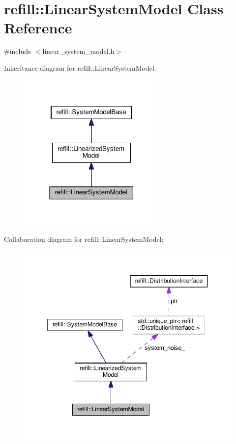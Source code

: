 \hypertarget{classrefill_1_1LinearSystemModel}{}\section{refill\+:\+:Linear\+System\+Model Class Reference}
\label{classrefill_1_1LinearSystemModel}


{\ttfamily \#include $<$linear\+\_\+system\+\_\+model.\+h$>$}



Inheritance diagram for refill\+:\+:Linear\+System\+Model\+:\nopagebreak
\begin{figure}[H]
\begin{center}
\leavevmode
\includegraphics[width=207pt]{classrefill_1_1LinearSystemModel__inherit__graph}
\end{center}
\end{figure}


Collaboration diagram for refill\+:\+:Linear\+System\+Model\+:\nopagebreak
\begin{figure}[H]
\begin{center}
\leavevmode
\includegraphics[width=345pt]{classrefill_1_1LinearSystemModel__coll__graph}
\end{center}
\end{figure}
